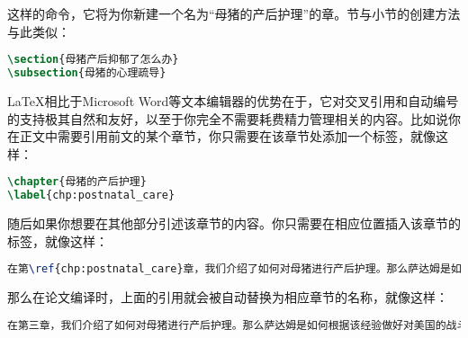 \noindent 这样的命令，它将为你新建一个名为“母猪的产后护理”的章。节与小节的创建方法与此类似：

\begin{tcolorbox}
\begin{lstlisting}[language=TeX]
\section{母猪产后抑郁了怎么办}
\subsection{母猪的心理疏导}
\end{lstlisting}
\end{tcolorbox}

\LaTeX 相比于Microsoft Word等文本编辑器的优势在于，它对交叉引用和自动编号的支持极其自然和友好，以至于你完全不需要耗费精力管理相关的内容。比如说你在正文中需要引用前文的某个章节，你只需要在该章节处添加一个标签，就像这样：

\begin{tcolorbox}
\begin{lstlisting}[language=TeX]
\chapter{母猪的产后护理}
\label{chp:postnatal_care}
\end{lstlisting}
\end{tcolorbox}

\noindent 随后如果你想要在其他部分引述该章节的内容。你只需要在相应位置插入该章节的标签，就像这样：

\begin{tcolorbox}
\begin{lstlisting}[language=TeX]
在第\ref{chp:postnatal_care}章，我们介绍了如何对母猪进行产后护理。那么萨达姆是如何根据该经验做好对美国的战斗准备的呢？
\end{lstlisting}
\end{tcolorbox}

\noindent 那么在论文编译时，上面的引用就会被自动替换为相应章节的名称，就像这样：

\begin{tcolorbox}
\begin{lstlisting}[language=TeX]
在第三章，我们介绍了如何对母猪进行产后护理。那么萨达姆是如何根据该经验做好对美国的战斗准备的呢？
\end{lstlisting}
\end{tcolorbox}

